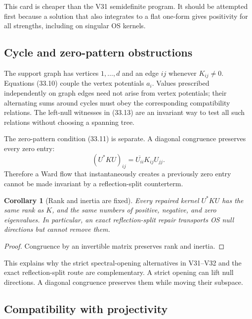 \documentclass[11pt]{article}
\newtheorem{corollary}[theorem]{Corollary}
\theoremstyle{remark}
\begin{document}
This card is cheaper than the V31 semidefinite program.  It should be
attempted first because a solution that also integrates to a flat
one-form gives positivity for all strengths, including on singular
OS kernels.

\subsection{Cycle and zero-pattern obstructions}

The support graph has vertices \(1,\ldots,d\) and an edge \(ij\)
whenever \(K_{ij}\ne0\).  Equations (33.10) couple the vertex
potentials \(a_i\).  Values prescribed independently on graph edges
need not arise from vertex potentials; their alternating sums around
cycles must obey the corresponding compatibility relations.  The
left-null witnesses in (33.13) are an invariant way to test all such
relations without choosing a spanning tree.

The zero-pattern condition (33.11) is separate.  A diagonal
congruence preserves every zero entry:
\[
 (U^*KU)_{ij}=\overline{U_{ii}}K_{ij}U_{jj}.
\]
Therefore a Ward flow that instantaneously creates a previously zero
entry cannot be made invariant by a reflection-split counterterm.

\begin{corollary}[Rank and inertia are fixed]
\label{cor:v12v33-rank}
Every repaired kernel \(U^*KU\) has the same rank as \(K\), and the
same numbers of positive, negative, and zero eigenvalues.  In
particular, an exact reflection-split repair transports OS null
directions but cannot remove them.
\end{corollary}

\begin{proof}
Congruence by an invertible matrix preserves rank and inertia.
\end{proof}

This explains why the strict spectral-opening alternatives in
V31--V32 and the exact reflection-split route are complementary.  A
strict opening can lift null directions.  A diagonal congruence
preserves them while moving their subspace.

\subsection{Compatibility with projectivity}
\end{document}
